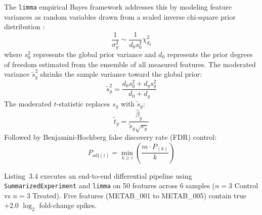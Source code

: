 \documentclass[11pt,twoside,openright]{book}
\begin{document}
The \texttt{limma} empirical Bayes framework addresses this by modeling feature variances as random variables drawn from a scaled inverse chi-square prior distribution \cite{smyth2004linear, ritchie2015limma}:
\begin{equation}
\frac{1}{\sigma_g^2} \sim \frac{1}{d_0 s_0^2} \chi_{d_0}^2
\label{eq:eb_prior}
\end{equation}
where $s_0^2$ represents the global prior variance and $d_0$ represents the prior degrees of freedom estimated from the ensemble of all measured features. The moderated variance $\tilde{s}_g^2$ shrinks the sample variance toward the global prior:
\begin{equation}
\tilde{s}_g^2 = \frac{d_0 s_0^2 + d_g s_g^2}{d_0 + d_g}
\label{eq:moderated_variance}
\end{equation}
The moderated $t$-statistic replaces $s_g$ with $\tilde{s}_g$:
\begin{equation}
\tilde{t}_g = \frac{\hat{\beta}_g}{\tilde{s}_g \sqrt{v_g}}
\label{eq:moderated_t}
\end{equation}
Followed by Benjamini-Hochberg false discovery rate (FDR) control:
\begin{equation}
P_{\text{adj}(i)} = \min_{k \ge i} \left( \frac{m \cdot P_{(k)}}{k} \right)
\label{eq:bh_fdr}
\end{equation}

Listing~3.4 executes an end-to-end differential pipeline using \texttt{SummarizedExperiment} and \texttt{limma} on 50 features across 6 samples ($n = 3$ Control vs $n = 3$ Treated). Five features (METAB\_001 to METAB\_005) contain true $+2.0$ $\log_2$ fold-change spikes.
\end{document}
